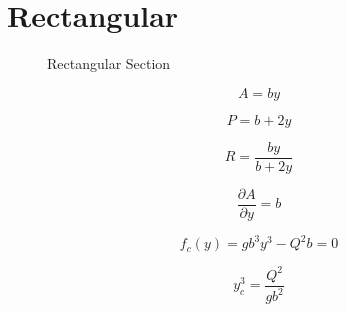 
\section{Rectangular}

\begin{figure}[h]
\centering
{}
\caption{Rectangular Section}
\end{figure}

\begin{equation}
A = by
\end{equation}

\begin{equation}
P = b + 2y
\end{equation}

\begin{equation}
R = \frac{by}{b+2y}
\end{equation}

\begin{equation}
\frac{\partial A}{\partial y} = b
\end{equation}

\begin{equation}  
f_c(y)= gb^3y^3 -Q^2b= 0
\end{equation}

\begin{equation}  
y_c^3 = \frac{Q^2}{gb^2}
\end{equation}
